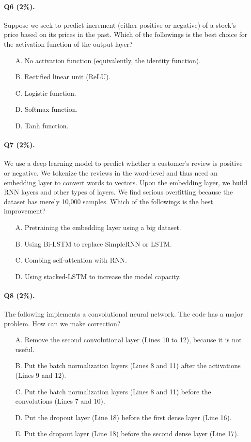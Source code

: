 \documentclass[11pt]{article}
\numberwithin{equation}{section}
\begin{document}
\paragraph{Q6 (2\%).} 
Suppose we seek to predict increment (either positive or negative) of a stock's price based on its prices in the past.
Which of the followings is the best choice for the activation function of the output layer?
\begin{itemize}
	\item[A.]
	No activation function (equivalently, the identity function).
	\item[B.]
	Rectified linear unit (ReLU).
	\item[C.]
	Logistic function.
	\item[D.]
	Softmax function.
	\item[D.]
	Tanh function.
\end{itemize}



\paragraph{Q7 (2\%).} 
We use a deep learning model to predict whether a customer's review is positive or negative.
We tokenize the reviews in the word-level and thus need an embedding layer to convert words to vectors.
Upon the embedding layer, we build RNN layers and other types of layers.
We find serious overfitting because the dataset has merely 10,000 samples.
Which of the followings is the best improvement?
\begin{itemize}
	\item[A.]
	Pretraining the embedding layer using a big dataset.
	\item[B.]
	Using Bi-LSTM to replace SimpleRNN or LSTM.
	\item[C.]
	Combing self-attention with RNN.
	\item[D.]
	Using stacked-LSTM to increase the model capacity.
\end{itemize}




\paragraph{Q8 (2\%).} 
The following implements a convolutional neural network.
The code has a major problem.
How can we make correction?
\begin{itemize}
	\item[A.]
	Remove the second convolutional layer (Lines 10 to 12), because it is not useful.
	\item[B.]
	Put the batch normalization layers (Lines 8 and 11) after the activations (Lines 9 and 12).
	\item[C.]
	Put the batch normalization layers (Lines 8 and 11) before the convolutions (Lines 7 and 10).
	\item[D.]
	Put the dropout layer (Line 18) before the first dense layer (Line 16).
	\item[E.]
	Put the dropout layer (Line 18) before the second dense layer (Line 17).
\end{itemize}
\end{document}
